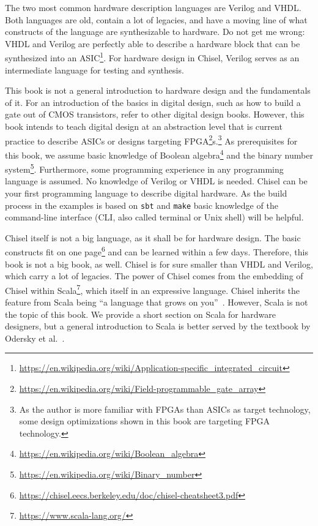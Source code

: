 \documentclass[%
    10pt,
    headinclude, footexclude,
    openright, %
    notitlepage,
    cleardoubleempty,
    headsepline,
    pointlessnumbers,
    bibtotoc, idxtotoc,
    ]{scrbook}
\newcommand{\code}[1]{{\small{\texttt{#1}}}}
\newcommand{\myref}[2]{\href{#1}{#2}}
\renewcommand{\myref}[2]{{#2}{\footnote{\url{#1}}}}
\begin{document}
The two most common hardware description languages are Verilog and VHDL.
Both languages are old, contain a lot of legacies, and have a moving line of what
constructs of the language are synthesizable to hardware.
Do not get me wrong: VHDL and Verilog are perfectly able to describe a hardware
block that can be synthesized into an
\myref{https://en.wikipedia.org/wiki/Application-specific_integrated_circuit}{ASIC}.
For hardware design in Chisel, Verilog serves as an intermediate language
for testing and synthesis.

This book is not a general introduction to hardware design and the fundamentals of it.
For an introduction of the basics in digital design, such as how to build a gate out of
CMOS transistors, refer to other digital design books.
However, this book intends to teach digital design at an abstraction level that is
current practice to describe ASICs or designs targeting
\myref{https://en.wikipedia.org/wiki/Field-programmable_gate_array}{FPGA}s.\footnote{As the author is more familiar with FPGAs
than ASICs as target technology, some design optimizations shown in this book are
targeting FPGA technology.}
As prerequisites for this book, we assume basic knowledge of
\myref{https://en.wikipedia.org/wiki/Boolean_algebra}{Boolean algebra} and the
\myref{https://en.wikipedia.org/wiki/Binary_number}{binary number system}.
Furthermore, some programming experience in any programming language
is assumed. No knowledge of Verilog or VHDL is needed.
Chisel can be your first programming language to describe digital hardware.
As the build process in the examples is based on \code{sbt} and \code{make}
basic knowledge of the command-line interface (CLI, also called terminal or
Unix shell) will be helpful.

Chisel itself is not a big language, as it shall be for hardware design.
The basic constructs fit on
\myref{https://chisel.eecs.berkeley.edu/doc/chisel-cheatsheet3.pdf}{one page}
and can be learned within a few days.
Therefore, this book is not a big book, as well.
Chisel is for sure smaller than VHDL and Verilog, which carry a lot of legacies.
The power of Chisel comes from the embedding of Chisel within
\myref{https://www.scala-lang.org/}{Scala}, which itself in an expressive language.
Chisel inherits the feature from Scala being ``a language that grows on you''~\cite{Scala}.
However, Scala is not the topic of this book.
We provide a short section on Scala for hardware designers,
but a general introduction to Scala is better served by the textbook by
Odersky et al.~\cite{Scala}.
\end{document}
